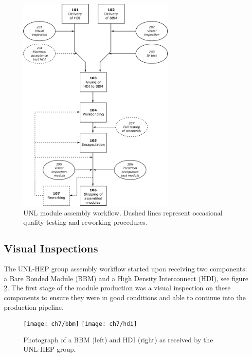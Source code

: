 
\begin{figure}[!h]
	\centering
	\includegraphics[width=0.7\textwidth]{../images/ch7/unl_workflow}
	\caption[UNL module assembly workflow]{UNL module assembly workflow. Dashed lines represent occasional quality testing and reworking procedures\cite{ph1_sop}.}
	\label{fig:unlworkflow}
\end{figure}

\subsection{Visual Inspections}
The UNL-HEP group assembly workflow started upon receiving two components: a Bare Bonded Module (BBM) and a High Density Interconnect (HDI), see figure \ref{fig:bbmyhdi}. The first stage of the module production was a visual inspection on these components to ensure they were in good conditions and able to continue into the production pipeline.

\begin{figure}[!h]
	\centering
	\texttt{[image: ch7/bbm]}
	\texttt{[image: ch7/hdi]}
	\caption[Photograph of a BBM and HDI.]{Photograph of a BBM (left) and HDI (right) as received by the UNL-HEP group.}
	\label{fig:bbmyhdi}
\end{figure}

